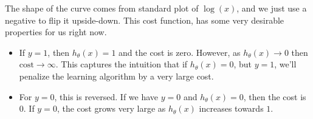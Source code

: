 The shape of the curve comes from standard plot of $\log\left(x\right)$, and we just use a negative to flip it upside-down. This cost function, has some very desirable properties for us right now. 


\noindent \begin{minipage}{\linewidth}
\begin{itemize}
\item If $y = 1$, then $h_\theta\left(x\right) = 1$ and the cost is zero. However, as $h_\theta\left(x\right) \to 0$ then $\text{cost} \to \infty$. This captures the intuition that if $h_\theta\left(x\right) = 0$, but $y=1$, we'll penalize the learning algorithm by a very large cost. 
\item For $y=0$, this is reversed. If we have $y=0$ and $h_\theta\left(x\right) = 0$, then the cost is $0$. If $y=0$, the cost grows very large as $h_\theta\left(x\right)$ increases towards $1$. 
\end{itemize}
\end{minipage}



































